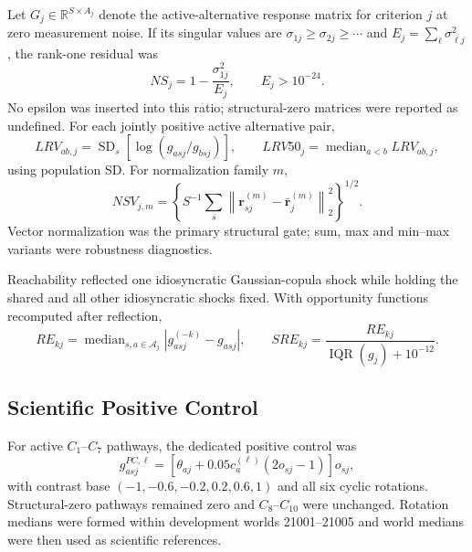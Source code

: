\documentclass[runningheads]{llncs}
\newcommand{\median}{\operatorname{median}}
\newcommand{\IQR}{\operatorname{IQR}}
\newcommand{\SD}{\operatorname{SD}}
\begin{document}
Let $G_j\in\mathbb R^{S\times A_j}$ denote the active-alternative response matrix for criterion
$j$ at zero measurement noise. If its singular values are
$\sigma_{1j}\ge\sigma_{2j}\ge\cdots$ and
$E_j=\sum_\ell\sigma_{\ell j}^2$, the rank-one residual was
\begin{equation}
NS_j=1-\frac{\sigma_{1j}^2}{E_j},
\qquad E_j>10^{-24}.
\label{supp:eq:NS}
\end{equation}
No epsilon was inserted into this ratio; structural-zero matrices were reported as undefined.
For each jointly positive active alternative pair,
\begin{equation}
LRV_{ab,j}=\SD_s\!\left[\log(g_{asj}/g_{bsj})\right],
\qquad
LRV50_j=\median_{a<b}LRV_{ab,j},
\label{supp:eq:LRV}
\end{equation}
using population SD. For normalization family $m$,
\begin{equation}
NSV_{j,m}=\left\{S^{-1}\sum_s
\left\|\mathbf r_{sj}^{(m)}-\bar{\mathbf r}_j^{(m)}\right\|_2^2\right\}^{1/2}.
\label{supp:eq:NSV}
\end{equation}
Vector normalization was the primary structural gate; sum, max and min--max variants were
robustness diagnostics.

Reachability reflected one idiosyncratic Gaussian-copula shock while holding the shared and all
other idiosyncratic shocks fixed. With opportunity functions recomputed after reflection,
\begin{equation}
RE_{kj}=\median_{s,a\in\mathcal A_j}|g_{asj}^{(-k)}-g_{asj}|,
\qquad
SRE_{kj}=\frac{RE_{kj}}{\IQR(g_j)+10^{-12}}.
\label{supp:eq:SRE}
\end{equation}

\subsection{Scientific Positive Control}

For active $C_1$--$C_7$ pathways, the dedicated positive control was
\begin{equation}
g_{asj}^{PC,\ell}=\left[\theta_{aj}+0.05c_a^{(\ell)}(2o_{sj}-1)\right]o_{sj},
\label{supp:eq:positivecontrol}
\end{equation}
with contrast base $(-1,-0.6,-0.2,0.2,0.6,1)$ and all six cyclic rotations. Structural-zero
pathways remained zero and $C_8$--$C_{10}$ were unchanged. Rotation medians were formed within
development worlds 21001--21005 and world medians were then used as scientific references.
\end{document}
